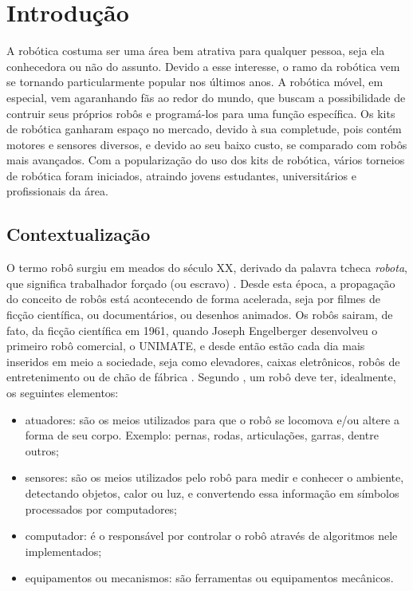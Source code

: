 \chapter{Introdução}
A robótica costuma ser uma área bem atrativa para qualquer pessoa, seja ela conhecedora ou não do assunto. Devido a esse interesse, o ramo da robótica vem se tornando particularmente popular nos últimos anos. A robótica móvel, em especial, vem agaranhando fãs ao redor do mundo, que buscam a possibilidade de contruir seus próprios robôs e programá-los para uma função específica. Os kits de robótica ganharam espaço no mercado, devido à sua completude, pois contém motores e sensores diversos, e devido ao seu baixo custo, se comparado com robôs mais avançados. Com a popularização do uso dos kits de robótica, vários torneios de robótica foram iniciados, atraindo jovens estudantes, universitários e profissionais da área. 

\section{Contextualização}

O termo robô surgiu em meados do século XX, derivado da palavra tcheca \textit{robota}, que significa trabalhador forçado (ou escravo) \cite{da2009roboeduc}. Desde esta época, a propagação do conceito de robôs está acontecendo de forma acelerada, seja por filmes de ficção científica, ou documentários, ou desenhos animados. 
Os robôs sairam, de fato, da ficção científica em 1961, quando Joseph Engelberger desenvolveu o primeiro robô comercial, o UNIMATE, e desde então estão cada dia mais inseridos em meio a sociedade, seja como elevadores, caixas eletrônicos, robôs de entretenimento ou de chão de fábrica . 
Segundo \cite{da2009roboeduc}, um robô deve ter, idealmente, os seguintes elementos:
\begin{itemize}
\item atuadores: são os meios utilizados para que o robô se locomova e/ou altere a forma de seu corpo. Exemplo: pernas, rodas, articulações, garras, dentre outros;
\item sensores: são os meios utilizados pelo robô para medir e conhecer o ambiente, detectando objetos, calor ou luz, e convertendo essa informação em símbolos processados por computadores;
\item computador: é o responsável por controlar o robô através de algoritmos nele implementados;
\item equipamentos ou mecanismos: são ferramentas ou equipamentos mecânicos.
\end{itemize}

